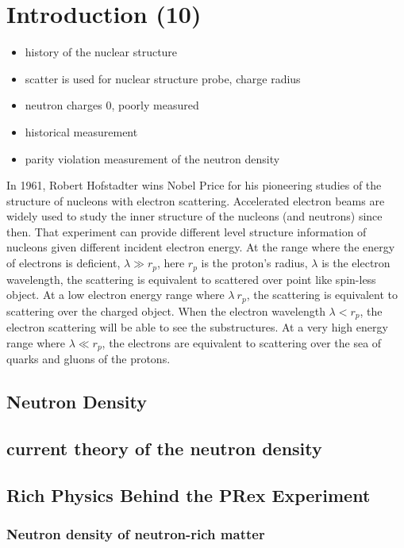 \chapter{Introduction (10)}


\begin{itemize}
    \item history of the nuclear structure
    \item scatter is used for nuclear structure probe, charge radius 
    \item neutron charges 0, poorly measured
    \item historical measurement 
    \item parity violation measurement of the neutron density
\end{itemize} 

In 1961, Robert Hofstadter wins Nobel Price for his pioneering studies of the structure of nucleons with electron scattering. Accelerated electron beams are widely used to study the inner structure of the nucleons (and neutrons) since then. That experiment can provide different level structure information of nucleons given different incident electron energy. At the range where the energy of electrons is deficient, $\lambda \gg r_p$, here $r_p$ is the proton's radius, $\lambda$ is the electron wavelength, the scattering is equivalent to scattered over point like spin-less object. At a low electron energy range where $\lambda ~r_p$, the scattering is equivalent to scattering over the charged object. When the electron wavelength $\lambda < r_p$, the electron scattering will be able to see the substructures. At a very high energy range where $\lambda \ll r_p$, the electrons are equivalent to scattering over the sea of quarks and gluons of the protons. 

\section{Neutron Density}
\section{current theory of the neutron density}

\section{Rich Physics Behind the PRex Experiment}
\subsection{Neutron density of neutron-rich matter}
